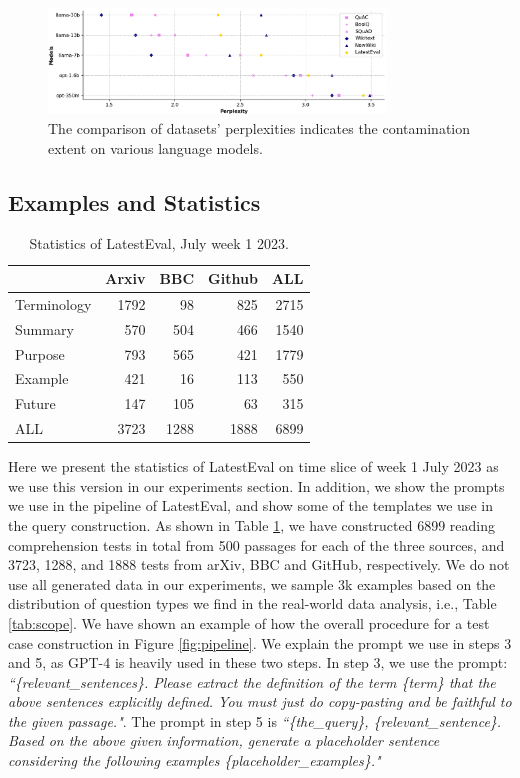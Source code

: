 \documentclass[letterpaper]{article} %
\begin{document}
\begin{figure}[t]
    \centering
    \includegraphics[width=0.8\textwidth]{contamination.png}
    \caption{The comparison of datasets' perplexities indicates the contamination extent on various language models.}
    \label{fig:contamination}
\end{figure}

\subsection{Examples and Statistics}

\begin{table}
    \centering
    \begin{tabular}{lrrr|r}
    \toprule
         & Arxiv & BBC & Github & ALL  \\
    \midrule
    Terminology & 1792 &  98 &  825 & 2715 \\
    Summary     &  570 & 504 &  466 & 1540 \\
    Purpose     &  793 & 565 &  421 & 1779 \\
    Example     &  421 &  16 &  113 & 550  \\
    Future      &  147 & 105 &   63 & 315  \\
    \midrule
    ALL         & 3723 & 1288 & 1888 & 6899 \\
    \bottomrule
    \end{tabular}
    \caption{Statistics of LatestEval, July week 1 2023.}
    \label{tab:statistics}
\end{table}

Here we present the statistics of LatestEval on time slice of week 1 July 2023 as we use this version in our experiments section. In addition, we show the prompts we use in the pipeline of LatestEval, and show some of the templates we use in the query construction. As shown in Table \ref{tab:statistics}, we have constructed 6899 reading comprehension tests in total from 500 passages for each of the three sources, and 3723, 1288, and 1888 tests from arXiv, BBC and GitHub, respectively. We do not use all generated data in our experiments, we sample 3k examples based on the distribution of question types we find in the real-world data analysis, i.e., Table \ref{tab:scope}. We have shown an example of how the overall procedure for a test case construction in Figure \ref{fig:pipeline}. We explain the prompt we use in steps 3 and 5, as GPT-4 is heavily used in these two steps. In step 3, we use the prompt: \textit{``\{relevant\_sentences\}. Please extract the definition of the term \{term\} that the above sentences explicitly defined. You must just do copy-pasting and be faithful to the given passage."}. The prompt in step 5 is \textit{``\{the\_query\}, \{relevant\_sentence\}. Based on the above given information, generate a placeholder sentence considering the following examples \{placeholder\_examples\}."}
\end{document}
